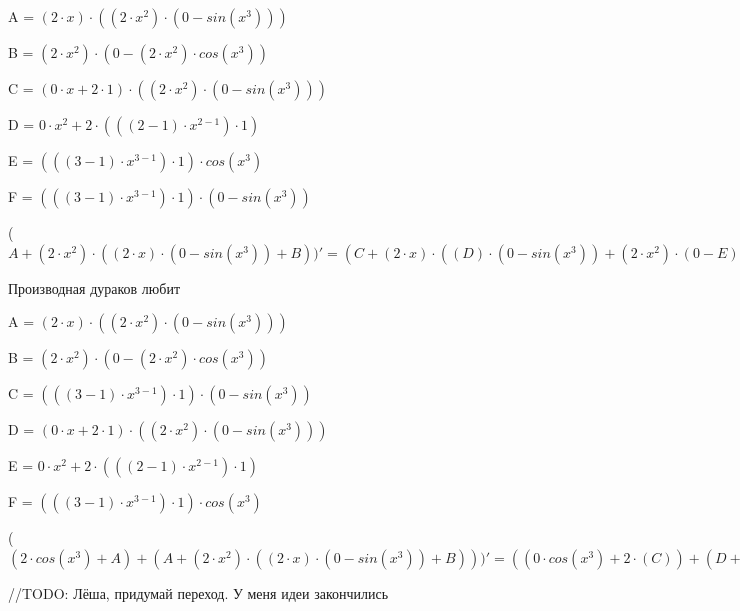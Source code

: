 \documentclass[12pt,a4paper,fleqn]{article}
\begin{document}
\begin{center}
A = $(2 \cdot x) \cdot ((2 \cdot x^{2}) \cdot (0-sin(x^{3})))$\end{center}
\begin{center}
B = $(2 \cdot x^{2}) \cdot (0-(2 \cdot x^{2}) \cdot cos(x^{3}))$\end{center}
\begin{center}
C = $(0 \cdot x+2 \cdot 1) \cdot ((2 \cdot x^{2}) \cdot (0-sin(x^{3})))$\end{center}
\begin{center}
D = $0 \cdot x^{2}+2 \cdot (((2-1) \cdot x^{2-1}) \cdot 1)$\end{center}
\begin{center}
E = $(((3-1) \cdot x^{3-1}) \cdot 1) \cdot cos(x^{3})$\end{center}
\begin{center}
F = $(((3-1) \cdot x^{3-1}) \cdot 1) \cdot (0-sin(x^{3}))$\end{center}
\begin{center}
 ($A+(2 \cdot x^{2}) \cdot ((2 \cdot x) \cdot (0-sin(x^{3}))+B))'
  = (C+(2 \cdot x) \cdot ((D) \cdot (0-sin(x^{3}))+(2 \cdot x^{2}) \cdot (0-E)))+((D) \cdot ((2 \cdot x) \cdot (0-sin(x^{3}))+B)+(2 \cdot x^{2}) \cdot (((0 \cdot x+2 \cdot 1) \cdot (0-sin(x^{3}))+(2 \cdot x) \cdot (0-E))+((D) \cdot (0-(2 \cdot x^{2}) \cdot cos(x^{3}))+(2 \cdot x^{2}) \cdot (0-((D) \cdot cos(x^{3})+(2 \cdot x^{2}) \cdot (F))))))$\end{center}
Производная дураков любит\cite{link2}

\begin{center}
A = $(2 \cdot x) \cdot ((2 \cdot x^{2}) \cdot (0-sin(x^{3})))$\end{center}
\begin{center}
B = $(2 \cdot x^{2}) \cdot (0-(2 \cdot x^{2}) \cdot cos(x^{3}))$\end{center}
\begin{center}
C = $(((3-1) \cdot x^{3-1}) \cdot 1) \cdot (0-sin(x^{3}))$\end{center}
\begin{center}
D = $(0 \cdot x+2 \cdot 1) \cdot ((2 \cdot x^{2}) \cdot (0-sin(x^{3})))$\end{center}
\begin{center}
E = $0 \cdot x^{2}+2 \cdot (((2-1) \cdot x^{2-1}) \cdot 1)$\end{center}
\begin{center}
F = $(((3-1) \cdot x^{3-1}) \cdot 1) \cdot cos(x^{3})$\end{center}
\begin{center}
 ($(2 \cdot cos(x^{3})+A)+(A+(2 \cdot x^{2}) \cdot ((2 \cdot x) \cdot (0-sin(x^{3}))+B)))'
  = ((0 \cdot cos(x^{3})+2 \cdot (C))+(D+(2 \cdot x) \cdot ((E) \cdot (0-sin(x^{3}))+(2 \cdot x^{2}) \cdot (0-F))))+((D+(2 \cdot x) \cdot ((E) \cdot (0-sin(x^{3}))+(2 \cdot x^{2}) \cdot (0-F)))+((E) \cdot ((2 \cdot x) \cdot (0-sin(x^{3}))+B)+(2 \cdot x^{2}) \cdot (((0 \cdot x+2 \cdot 1) \cdot (0-sin(x^{3}))+(2 \cdot x) \cdot (0-F))+((E) \cdot (0-(2 \cdot x^{2}) \cdot cos(x^{3}))+(2 \cdot x^{2}) \cdot (0-((E) \cdot cos(x^{3})+(2 \cdot x^{2}) \cdot (C)))))))$\end{center}
//TODO: Лёша, придумай переход. У меня идеи закончились
\end{document}

